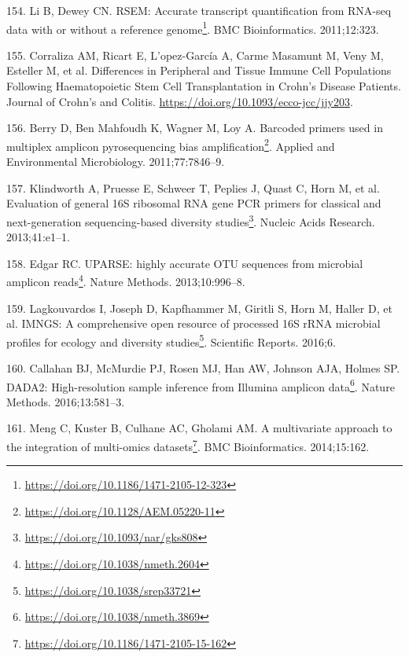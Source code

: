\documentclass[
  a4paper,
]{book}
\DeclareRobustCommand{\href}[2]{#2\footnote{\url{#1}}}
\newlength{\cslhangindent}
\newlength{\cslentryspacingunit} %
\newenvironment{CSLReferences}[2] %
 {%
  \setlength{\parindent}{0pt}
  \ifodd #1
  \let\oldpar\par
  \def\par{\hangindent=\cslhangindent\oldpar}
  \fi
  \setlength{\parskip}{#2\cslentryspacingunit}
 }%
 {}
\begin{document}
\begin{CSLReferences}{0}{0}
\leavevmode{}%
154. Li B, Dewey CN. \href{https://doi.org/10.1186/1471-2105-12-323}{RSEM: Accurate transcript quantification from RNA-seq data with or without a reference genome}. BMC Bioinformatics. 2011;12:323.

\leavevmode{}%
155. Corraliza AM, Ricart E, L'opez-García A, Carme Masamunt M, Veny M, Esteller M, et al. Differences in {Peripheral} and {Tissue Immune Cell Populations Following Haematopoietic Stem Cell Transplantation} in {Crohn}'s {Disease Patients}. Journal of Crohn's and Colitis. \url{https://doi.org/10.1093/ecco-jcc/jjy203}.

\leavevmode{}%
156. Berry D, Ben Mahfoudh K, Wagner M, Loy A. \href{https://doi.org/10.1128/AEM.05220-11}{Barcoded primers used in multiplex amplicon pyrosequencing bias amplification}. Applied and Environmental Microbiology. 2011;77:7846--9.

\leavevmode{}%
157. Klindworth A, Pruesse E, Schweer T, Peplies J, Quast C, Horn M, et al. \href{https://doi.org/10.1093/nar/gks808}{Evaluation of general 16S ribosomal RNA gene PCR primers for classical and next-generation sequencing-based diversity studies}. Nucleic Acids Research. 2013;41:e1--1.

\leavevmode{}%
158. Edgar RC. \href{https://doi.org/10.1038/nmeth.2604}{UPARSE: highly accurate OTU sequences from microbial amplicon reads}. Nature Methods. 2013;10:996--8.

\leavevmode{}%
159. Lagkouvardos I, Joseph D, Kapfhammer M, Giritli S, Horn M, Haller D, et al. \href{https://doi.org/10.1038/srep33721}{IMNGS: A comprehensive open resource of processed 16S rRNA microbial profiles for ecology and diversity studies}. Scientific Reports. 2016;6.

\leavevmode{}%
160. Callahan BJ, McMurdie PJ, Rosen MJ, Han AW, Johnson AJA, Holmes SP. \href{https://doi.org/10.1038/nmeth.3869}{DADA2: High-resolution sample inference from Illumina amplicon data}. Nature Methods. 2016;13:581--3.

\leavevmode{}%
161. Meng C, Kuster B, Culhane AC, Gholami AM. \href{https://doi.org/10.1186/1471-2105-15-162}{A multivariate approach to the integration of multi-omics datasets}. BMC Bioinformatics. 2014;15:162.


\end{CSLReferences}
\end{document}
